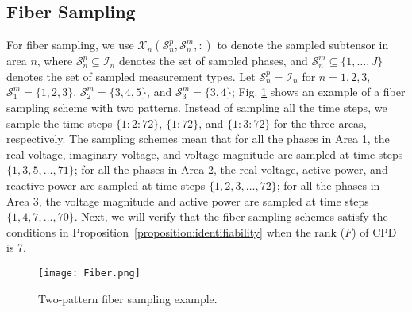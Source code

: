 \documentclass[journal]{IEEEtran}
\newcommand{\Ten}[1]{\mathcal{#1}}
\begin{document}
\subsection{Fiber Sampling}
\label{sec:fibersampling}
For fiber sampling, we use  $\Ten{\bar{X}}_n(\mathcal{S}_n^p,\mathcal{S}_n^m,:)$ to denote the sampled subtensor in area $n$, where $\mathcal{S}_n^p\subseteq\mathcal{I}_n$ denotes the set of sampled phases, and $\mathcal{S}_n^m\subseteq\{1,\ldots, J\}$ denotes the set of  sampled measurement types. 
Let $\mathcal{S}_n^p=\mathcal{I}_n$ for $n=1,2,3$, $\mathcal{S}_1^m =\{1,2,3\}$, $\mathcal{S}_2^m =\{3,4,5\}$, and $\mathcal{S}_3^m =\{3,4\}$; Fig. \ref{fig:fiber} shows an example of a fiber sampling scheme with two patterns. Instead of sampling all the time steps, we sample
the time steps $\{1:2:72\}$, $\{1:72\}$, and $\{1:3:72\}$  for the three areas, respectively. The sampling schemes mean that for all the phases in Area 1, the real voltage, imaginary voltage, and voltage magnitude are sampled  at time steps $\{1,3,5,\ldots, 71\}$; for all the phases  in Area 2, the real voltage, active power, and reactive power are sampled at  time steps $\{1,2,3,\ldots, 72\}$; for all the phases  in Area 3, the voltage magnitude and active power are sampled at  time steps $\{1,4,7,\ldots, 70\}$. Next, we will verify that the fiber sampling schemes satisfy the conditions in Proposition~\ref{proposition:identifiability}  when the rank ($F$) of CPD is 7.


\begin{figure}
    \centering
  \texttt{[image: Fiber.png]}
    \caption{Two-pattern fiber sampling example.}
    \label{fig:fiber}
\end{figure}
\end{document}

